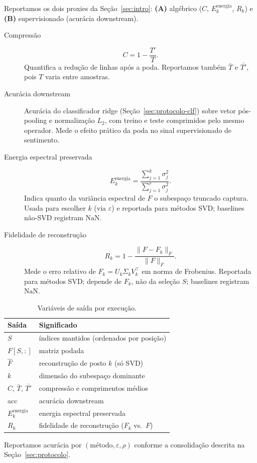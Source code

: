 Reportamos os dois proxies da Seção~\ref{sec:intro}: \textbf{(A)} algébrico ($C$, $E_k^{\mathrm{energia}}$, $R_k$) e \textbf{(B)} supervisionado (acurácia downstream).

\begin{description}
    \item[Compressão]
    \begin{equation*}
        C = 1 - \frac{T'}{T}.
    \end{equation*}
    Quantifica a redução de linhas após a poda. Reportamos também $\bar{T}$ e $\bar{T'}$, pois $T$ varia entre amostras.

    \item[Acurácia downstream]
    Acurácia do classificador ridge (Seção~\ref{sec:protocolo-clf}) sobre vetor pós-pooling e normalização $L_2$, com treino e teste comprimidos pelo mesmo operador. Mede o efeito prático da poda no sinal supervisionado de sentimento.

    \item[Energia espectral preservada]
    \begin{equation*}
        E_k^{\mathrm{energia}} =
        \frac{\sum_{j=1}^{k}\sigma_j^2}{\sum_{j=1}^{r}\sigma_j^2}.
    \end{equation*}
    Indica quanto da variância espectral de $F$ o subespaço truncado captura. Usada para escolher $k$ (via $\varepsilon$) e reportada para métodos SVD; baselines não-SVD registram $\mathrm{NaN}$.

    \item[Fidelidade de reconstrução]
    \begin{equation*}
        R_k = 1 - \frac{\|F - F_k\|_F}{\|F\|_F}.
    \end{equation*}
    Mede o erro relativo de $F_k = U_k \Sigma_k V_k^\top$ em norma de Frobenius. Reportada para métodos SVD; depende de $F_k$, não da seleção $S$; baselines registram $\mathrm{NaN}$.
\end{description}

\begin{table}[ht]
    \centering
    \caption{Variáveis de saída por execução.}
    \label{tab:saidas}
    \begin{tabular}{ll}
        \hline
        Saída & Significado \\
        \hline
        $S$ & índices mantidos (ordenados por posição) \\
        $F[S,:]$ & matriz podada \\
        $\hat{F}$ & reconstrução de posto $k$ (só SVD) \\
        $k$ & dimensão do subespaço dominante \\
        $C$, $\bar{T}$, $\bar{T'}$ & compressão e comprimentos médios \\
        acc & acurácia downstream \\
        $E_k^{\mathrm{energia}}$ & energia espectral preservada \\
        $R_k$ & fidelidade de reconstrução ($F_k$ vs.\ $F$) \\
        \hline
    \end{tabular}
\end{table}

Reportamos acurácia por $(\mathrm{método}, \varepsilon, \rho)$ conforme a consolidação descrita na Seção~\ref{sec:protocolo}.
